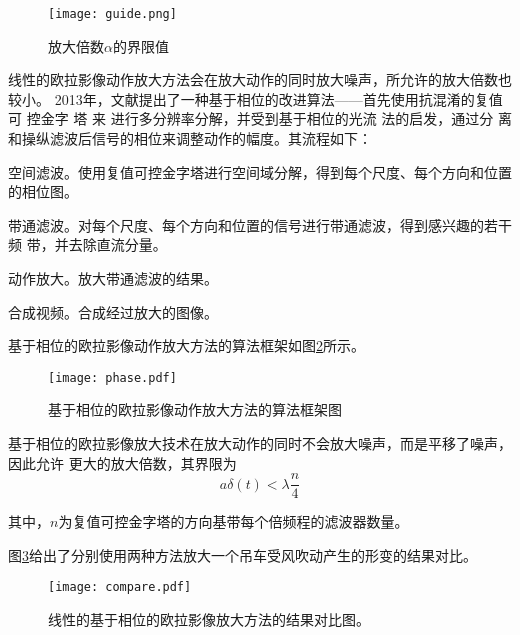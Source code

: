 \begin{figure}[htbp]
  \centering
  \texttt{[image: guide.png]}
  \caption{放大倍数$\alpha$的界限值}
  \label{fig:guide}
\end{figure}

线性的欧拉影像动作放大方法会在放大动作的同时放大噪声，所允许的放大倍数也较小。
2013年，文献\cite{Wadhwa2013PhaseBased}提出了一种基于相位的改进算法——首先使用抗混淆的复值可
控金字
塔
来
进行多分辨率分解，并受到基于相位的光流
法的启发，通过分
离和操纵滤波后信号的相位来调整动作的幅度。其流程如下：

\begin{compactenum}
\item 空间滤波。使用复值可控金字塔进行空间域分解，得到每个尺度、每个方向和位置的相位图。
\item 带通滤波。对每个尺度、每个方向和位置的信号进行带通滤波，得到感兴趣的若干频
  带，并去除直流分量。
\item 动作放大。放大带通滤波的结果。
\item 合成视频。合成经过放大的图像。
\end{compactenum}

基于相位的欧拉影像动作放大方法的算法框架如图\ref{fig:phase}所示。

\begin{figure}[htbp]
  \centering
  \texttt{[image: phase.pdf]}
  \caption{基于相位的欧拉影像动作放大方法的算法框架图}
  \label{fig:phase}
\end{figure}

基于相位的欧拉影像放大技术在放大动作的同时不会放大噪声，而是平移了噪声，因此允许
更大的放大倍数，其界限为
\begin{equation}
  \label{eq:bound2}
  a\delta(t)<\lambda \frac{n}{4}
\end{equation}

其中，$n$为复值可控金字塔的方向基带每个倍频程的滤波器数量。

图\ref{fig:compare}给出了分别使用两种方法放大一个吊车受风吹动产生的形变的结果对比。

\begin{figure}[htbp]
  \centering
  \texttt{[image: compare.pdf]}
  \caption{线性的基于相位的欧拉影像放大方法的结果对比图。
  }
  \label{fig:compare}
\end{figure}

